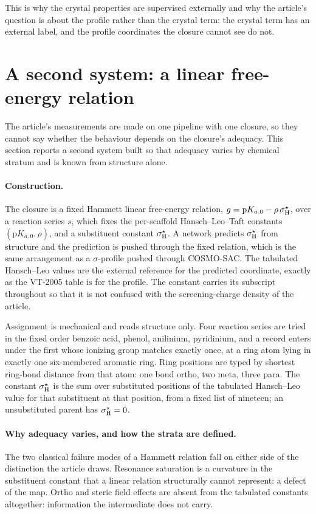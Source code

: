 This is why the crystal properties are supervised externally and why the article's question is
about the profile rather than the crystal term: the crystal term has an external label, and the
profile coordinates the closure cannot see do not.


\section{A second system: a linear free-energy relation}
\label{si:second}

The article's measurements are made on one pipeline with one closure, so they cannot say whether
the behaviour depends on the closure's adequacy. This section reports a second system built so
that adequacy varies by chemical stratum and is known from structure alone.

\paragraph{Construction.}
The closure is a fixed Hammett linear free-energy relation,
$g=\mathrm{p}K_{a,0}-\rho\,\sigma_{\mathrm H}^{\star}$, over a reaction series $s$, which fixes the
per-scaffold Hansch--Leo--Taft constants $(\mathrm{p}K_{a,0},\rho)$, and a substituent constant
$\sigma_{\mathrm H}^{\star}$. A network predicts $\sigma_{\mathrm H}^{\star}$ from structure and the prediction is
pushed through the fixed relation, which is the same arrangement as a $\sigma$-profile pushed
through COSMO-SAC. The tabulated Hansch--Leo values are the external reference for the predicted
coordinate, exactly as the VT-2005 table is for the profile. The constant carries its subscript
throughout so that it is not confused with the screening-charge density of the article.

Assignment is mechanical and reads structure only. Four reaction series are tried in the fixed
order benzoic acid, phenol, anilinium, pyridinium, and a record enters under the first whose
ionizing group matches exactly once, at a ring atom lying in exactly one six-membered aromatic
ring. Ring positions are typed by shortest ring-bond distance from that atom: one bond ortho, two
meta, three para. The constant $\sigma_{\mathrm H}^{\star}$ is the sum over substituted positions of the
tabulated Hansch--Leo value for that substituent at that position, from a fixed list of nineteen;
an unsubstituted parent has $\sigma_{\mathrm H}^{\star}=0$.

\paragraph{Why adequacy varies, and how the strata are defined.}
The two classical failure modes of a Hammett relation fall on either side of the distinction the
article draws. Resonance saturation is a curvature in the substituent constant that a linear
relation structurally cannot represent: a defect of the map. Ortho and steric field effects are
absent from the tabulated constants altogether: information the intermediate does not carry.

